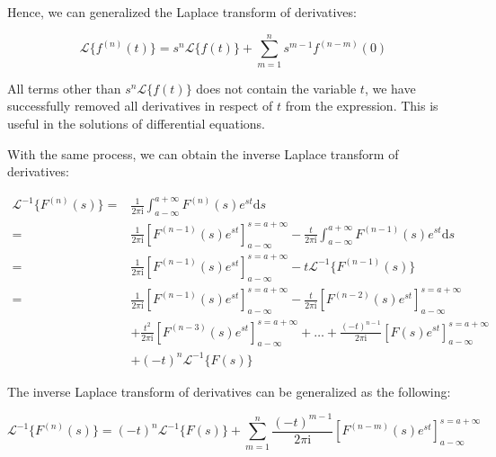 Hence, we can generalized the Laplace transform of derivatives:

\begin{equation}
    \mathcal{L}\{f^{(n)}(t)\}
    =  s^{n} \mathcal{L} \{ f(t) \} + 
        \sum_{m=1}^{n} s^{m-1} f^{(n-m)}(0)
    \label{equ:laplace_transform_of_derivatives}
\end{equation}

All terms other than $s^{n}\mathcal{L} \{ f(t) \}$ does not contain the variable $t$, 
we have successfully removed all derivatives in respect of $t$ from the expression. 
This is useful in the solutions of differential equations.

With the same process, we can obtain the inverse Laplace transform of derivatives:

\begin{align*}
    \mathcal{L}^{-1}\{F^{(n)}(s)\} 
    =&  \frac{1}{2\pi\mathrm{i}} \int_{a-\infty}^{a+\infty} F^{(n)}(s) e^{st} \mathrm{d}s     \\
    =&  \frac{1}{2\pi\mathrm{i}} \left[F^{(n-1)}(s) e^{st}\right]_{a-\infty}^{s=a+\infty}
            -   \frac{t}{2\pi\mathrm{i}} \int_{a-\infty}^{a+\infty} F^{(n-1)}(s) e^{st} \mathrm{d}s  \\
    =&  \frac{1}{2\pi\mathrm{i}} \left[F^{(n-1)}(s) e^{st}\right]_{a-\infty}^{s=a+\infty}
            -   t \mathcal{L}^{-1}\{ F^{(n-1)}(s) \}    \\
    =&  \frac{1}{2\pi\mathrm{i}} \left[F^{(n-1)}(s) e^{st}\right]_{a-\infty}^{s=a+\infty}
            -   \frac{t}{2\pi\mathrm{i}} \left[F^{(n-2)}(s) e^{st}\right]_{a-\infty}^{s=a+\infty}       \\
            &+   \frac{t^{2}}{2\pi\mathrm{i}} \left[F^{(n-3)}(s) e^{st}\right]_{a-\infty}^{s=a+\infty}
            +   \dots
            +   \frac{(-t)^{n-1}}{2\pi\mathrm{i}} \left[F(s) e^{st}\right]_{a-\infty}^{s=a+\infty}      \\
            &+   (-t)^{n} \mathcal{L}^{-1} \{ F(s) \}
\end{align*}

The inverse Laplace transform of derivatives can be generalized as the following: 

\begin{equation}
    \mathcal{L}^{-1}\{F^{(n)}(s)\}
    =  (-t)^{n} \mathcal{L}^{-1} \{ F(s) \} + 
        \sum_{m=1}^{n} \frac{(-t)^{m-1}}{2\pi\mathrm{i}} \left[F^{(n-m)}(s) e^{st} \right]_{a-\infty}^{s=a+\infty}
    \label{equ:inverse_laplace_transform_of_derivatives}
\end{equation}
 


